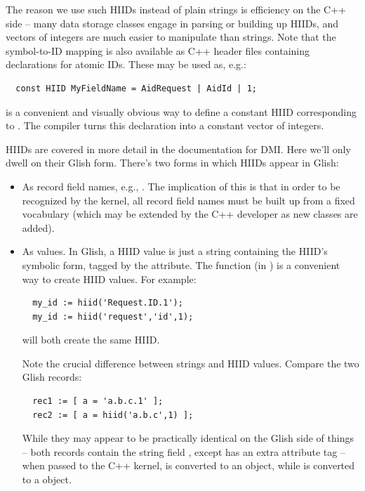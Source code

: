   The reason we use such HIIDs instead of plain strings is efficiency on the
  C++ side -- many data storage classes engage in parsing or building up HIIDs,
  and vectors of integers are much easier to manipulate than strings. Note that
  the symbol-to-ID mapping is also available as C++ header files containing
   declarations for atomic IDs. These may be used as, e.g.:

  \begin{verbatim}
  const HIID MyFieldName = AidRequest | AidId | 1;
  \end{verbatim}
  
  is a convenient and visually obvious way to define a constant HIID
  corresponding to . The compiler turns this declaration
  into a constant vector of integers.

  HIIDs are covered in more detail in the documentation for DMI. Here we'll
  only dwell on their Glish form. There's two forms in which HIIDs appear in
  Glish:
  
  \begin{itemize}
  
  \item As record field names, e.g., . The implication of
  this is that in order to be recognized by the kernel, all record field names
  must be built up from a fixed vocabulary (which may be extended by the
  C++ developer as new classes are added).

  \item As values. In Glish, a HIID value is just a string containing the
  HIID's symbolic form, tagged by the  attribute. The
   function (in ) is a convenient way to create HIID
  values. For example:

  \begin{verbatim}
  my_id := hiid('Request.ID.1');
  my_id := hiid('request','id',1);
  \end{verbatim}
  
  will both create the same HIID. 
  
  Note the crucial difference between strings and HIID values. Compare the two
  Glish records:

  \begin{verbatim}
  rec1 := [ a = 'a.b.c.1' ];
  rec2 := [ a = hiid('a.b.c',1) ];
  \end{verbatim}
  
  While they may appear to be practically identical on the Glish side of things
  -- both records contain the string field , except  has an
  extra attribute tag -- when passed to the C++ kernel,  is
  converted to an  object, while  is converted to a
   object.
  
  \end{itemize}

